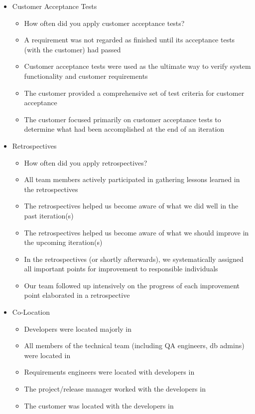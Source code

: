 \begin{appendices}
\begin{itemize}
\begin{itemize}
		\end{itemize}
	\item Customer Acceptance Tests
		\begin{itemize}
			\item How often did you apply customer acceptance tests?
			\item A requirement was not regarded as finished until its acceptance tests (with the customer) had passed
			\item Customer acceptance tests were used as the ultimate way to verify system functionality and customer requirements
			\item The customer provided a comprehensive set of test criteria for customer acceptance
			\item The customer focused primarily on customer acceptance tests to determine what had been accomplished at the end of an iteration
		\end{itemize}
	\item Retrospectives
		\begin{itemize}
			\item How often did you apply retrospectives?
			\item All team members actively participated in gathering lessons learned in the retrospectives
			\item The retrospectives helped us become aware of what we did well in the past iteration(s)
			\item The retrospectives helped us become aware of what we should improve in the upcoming iteration(s)
			\item In the retrospectives (or shortly afterwards), we systematically assigned all important points for improvement to responsible individuals
			\item Our team followed up intensively on the progress of each improvement point elaborated in a retrospective
		\end{itemize}
	\item Co-Location %
		\begin{itemize}
			\item Developers were located majorly in
			\item All members of the technical team (including QA engineers, db admins) were located in
			\item Requirements engineers were located with developers in
			\item The project/release manager worked with the developers in
			\item The customer was located with the developers in
		\end{itemize}
	

\end{itemize}
\end{appendices}
